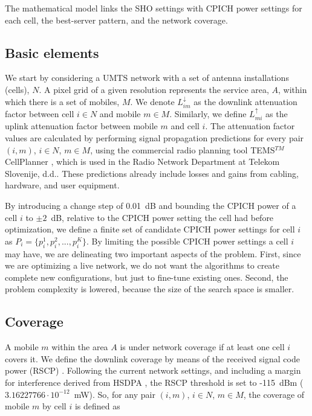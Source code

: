 The mathematical model links the SHO settings with CPICH power settings
for each cell, the best-server pattern, and the network coverage.


\subsection{Basic elements}

We start by considering a UMTS network with a set of antenna installations
(cells), $N$. A pixel grid of a given resolution represents the service
area, $A$, within which there is a set of mobiles, $M$. We denote
$L_{im}^{\downarrow}$ as the downlink attenuation factor between
cell $i\in N$ and mobile $m\in M$. Similarly, we define $L_{mi}^{\uparrow}$
as the uplink attenuation factor between mobile $m$ and cell $i$.
The attenuation factor values are calculated by performing signal
propagation predictions for every pair $(i,m)$, $i\in N$, $m\in M$,
using the commercial radio planning tool TEMS$^{TM}$ CellPlanner
\cite{tems}, which is used in the Radio Network Department at Telekom
Slovenije, d.d.. These predictions already include losses and gains
from cabling, hardware, and user equipment.

By introducing a change step of 0.01~dB and bounding the CPICH power
of a cell $i$ to $\pm2$~dB, relative to the CPICH power setting
the cell had before optimization, we define a finite set of candidate
CPICH power settings for cell $i$ as $P_{i}=\{p_{i}^{1},p_{i}^{2},...,p_{i}^{K}\}$.
By limiting the possible CPICH power settings a cell $i$ may have,
we are delineating two important aspects of the problem. First, since
we are optimizing a live network, we do not want the algorithms to
create complete new configurations, but just to fine-tune existing
ones. Second, the problem complexity is lowered, because the size
of the search space is smaller.


\subsection{Coverage}

A mobile $m$ within the area $A$ is under network coverage if at
least one cell $i$ covers it. We define the downlink coverage by
means of the received signal code power (RSCP) \cite{WCDMAforUMTS_RadioAccessForThirdGenerationMobileCommunications}.
Following the current network settings, and including a margin for
interference derived from HSDPA \cite{holma2006hsdpa}, the RSCP threshold
is set to -115~dBm ($3.16227766\cdot10^{-12}$~mW). So, for any
pair $(i,m)$, $i\in N$, $m\in M$, the coverage of mobile $m$ by
cell $i$ is defined as

